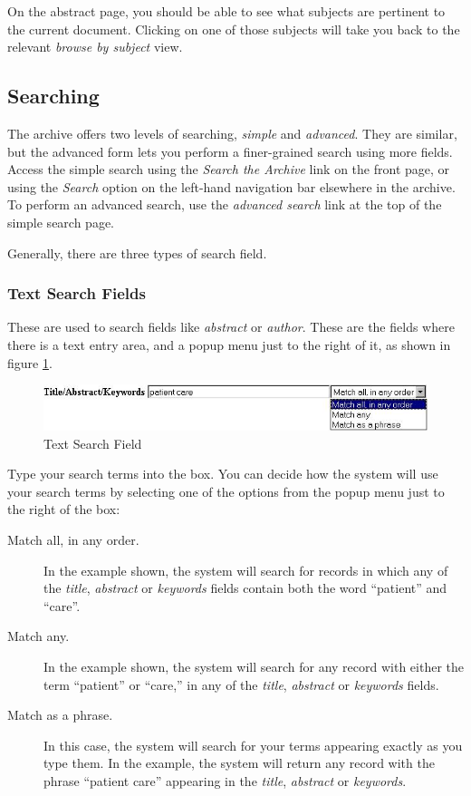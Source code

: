 On the abstract page, you should be able to see what subjects are pertinent to the current document. Clicking on one of those subjects will take you back to the relevant \emph{browse by subject} view.


\subsection{Searching}

The archive offers two levels of searching, \emph{simple} and \emph{advanced}. They are similar, but the advanced form lets you perform a finer-grained search using more fields. Access the simple search using the \emph{Search the Archive} link on the front page, or using the \emph{Search} option on the left-hand navigation bar elsewhere in the archive. To perform an advanced search, use the \emph{advanced search} link at the top of the simple search page.

Generally, there are three types of search field.

\subsubsection{Text Search Fields}

These are used to search fields like \emph{abstract} or \emph{author}. These are the fields where there is a text entry area, and a popup menu just to the right of it, as shown in figure \ref{searchfield}.

\begin{figure}
\centerline{\includegraphics[width=4.8in]{images/text-search-field}}
\caption{\label{searchfield} Text Search Field}
\end{figure}

Type your search terms into the box. You can decide how the system will use your search terms by selecting one of the options from the popup menu just to the right of the box:

\begin{description}
\item[Match all, in any order.] In the example shown, the system will search for records in which any of the \emph{title}, \emph{abstract} or \emph{keywords} fields contain both the word ``patient'' and ``care''.
\item[Match any.] In the example shown, the system will search for any record with either the term ``patient'' or ``care,'' in any of the \emph{title}, \emph{abstract} or \emph{keywords} fields.
\item[Match as a phrase.] In this case, the system will search for your terms appearing exactly as you type them. In the example, the system will return any record with the phrase ``patient care'' appearing in the \emph{title}, \emph{abstract} or \emph{keywords}.
\end{description}



